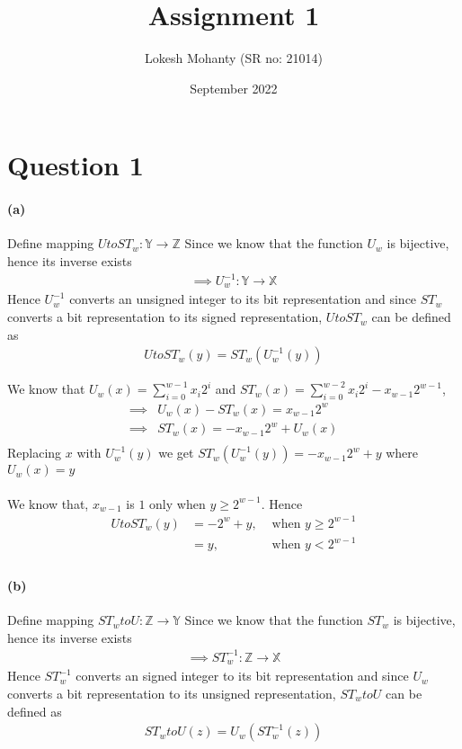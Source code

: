 \documentclass{article}
\title{Assignment 1}
\author{Lokesh Mohanty (SR no: 21014)}
\date{September 2022}
\begin{document}
\fontsize{14pt}{18pt}\selectfont

\maketitle

\section*{Question 1}
\label{sec:question-1}

\paragraph{(a)} Define mapping $UtoST_w: \mathbb{Y} \rightarrow \mathbb{Z}$
\newline\newline
Since we know that the function $U_w$ is bijective, hence its inverse exists
\begin{align*}
  \implies U_w^{-1}: \mathbb{Y} \rightarrow \mathbb{X}
\end{align*}
Hence $U_w^{-1}$ converts an unsigned integer to its bit representation and since $ST_w$ converts a bit representation to its signed representation, $UtoST_w$ can be defined as
\begin{align*}
  UtoST_w (y) = ST_w(U_w^{-1}(y))
\end{align*}

We know that $U_w(x) = \sum_{i=0}^{w-1}x_i2^i$ and $ST_w(x) = \sum_{i=0}^{w-2}x_i2^i - x_{w-1}2^{w-1}$,
\begin{align*}
  \implies &U_w(x) - ST_w(x) = x_{w-1}2^w\\
  \implies &ST_w(x) = -x_{w-1}2^w + U_w(x)\\
\end{align*}
Replacing $x$ with $U_w^{-1}(y)$ we get $ST_w(U_w^{-1}(y)) = -x_{w-1}2^w + y$ where $U_w(x) = y$\\\\
We know that, $x_{w-1}$ is $1$ only when $y \geq 2^{w-1}$. Hence
\begin{align*}
UtoST_w (y) &= -2^w + y, &\text{ when $y \geq 2^{w-1}$}\\
            &= y,        &\text{ when $y < 2^{w-1}$}\\
\end{align*}


\paragraph{(b)} Define mapping $ST_wtoU: \mathbb{Z} \rightarrow \mathbb{Y}$
\newline\newline
Since we know that the function $ST_w$ is bijective, hence its inverse exists
\begin{align*}
  \implies ST_w^{-1}: \mathbb{Z} \rightarrow \mathbb{X}
\end{align*}
Hence $ST_w^{-1}$ converts an signed integer to its bit representation and since $U_w$ converts a bit representation to its unsigned representation, $ST_wtoU$ can be defined as
\begin{align*}
  ST_wtoU (z) = U_w(ST_w^{-1}(z))
\end{align*}
\end{document}
